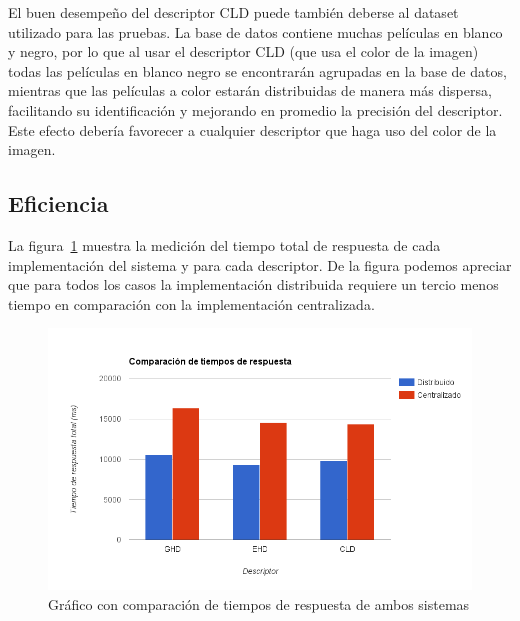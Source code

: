 El buen desempeño del descriptor CLD puede también deberse al dataset utilizado para las pruebas. La base de datos contiene muchas películas en blanco y negro, por lo que al usar el descriptor CLD (que usa el color de la imagen) todas las películas en blanco negro se encontrarán agrupadas en la base de datos, mientras que las películas a color estarán distribuidas de manera más dispersa, facilitando su identificación y mejorando en promedio la precisión del descriptor. Este efecto debería favorecer a cualquier descriptor que haga uso del color de la imagen.

\subsection{Eficiencia}

La figura~\ref{resultados_tiempos_total} muestra la medición del tiempo total de respuesta de cada implementación del sistema y para cada descriptor. De la figura podemos apreciar que para todos los casos la implementación distribuida requiere un tercio menos tiempo en comparación con la implementación centralizada. 

	\begin{figure}[!h]
		\centering
		\includegraphics[width=\textwidth]{imagenes/cap5/resultados_tiempos_total.png}
		\caption{Gráfico con comparación de tiempos de respuesta de ambos sistemas}
		\label{resultados_tiempos_total}
	\end{figure}

